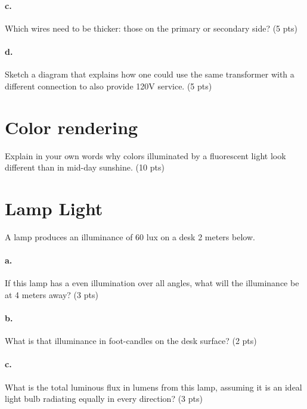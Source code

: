 \documentclass{article}
\newif\ifsolution
\newcommand{\solution}[1]
{\ifsolution
\vspace{10pt}
{\color{answer-color} #1}
\else\fi}
\begin{document}
\paragraph{c.} Which wires need to be thicker: those on the primary or secondary
side? (5 pts)

\paragraph{d.} Sketch a diagram that explains how one could use the same transformer
with a different connection to also provide 120V service. (5 pts)


\section{Color rendering}

Explain in your own words why colors illuminated by a fluorescent light
look different than in mid-day sunshine. (10 pts)

\solution{Our perception of the color of an object is based on the
relative powers of the different wavelengths of visible radiation
reflected by the object.  If the mixture of wavelengths illuminating the
object are different, the reflected spectrum, and thus the perceived
color of the object will be different.}

\section{Lamp Light}

A lamp produces an illuminance of 60 lux on a desk 2 meters below.

\paragraph{a.} If this lamp has a even illumination over all angles, what will the
illuminance be at 4 meters away? (3 pts)

\solution{By the inverse square law, the illumanance will decrease by a
factor of 4 and be 15 lux.}

\paragraph{b.} What is that illuminance in foot-candles on the desk surface? (2
pts)

\paragraph{c.} What is the total luminous flux in lumens from this lamp, assuming it
is an ideal light bulb radiating equally in every direction? (3 pts)
\end{document}
